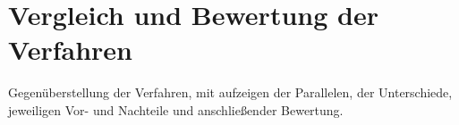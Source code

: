 \section{Vergleich und Bewertung der Verfahren} %
\label{sec:vergleich_und_bewertung_der_verfahren}
Gegenüberstellung der Verfahren, mit aufzeigen der Parallelen, der Unterschiede, jeweiligen Vor- und Nachteile und anschließender Bewertung.
